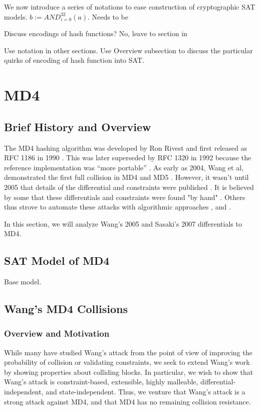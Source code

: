 \documentclass[letterpaper,twocolumn,10pt]{article}
\begin{document}
We now introduce a series of notations to ease construction of cryptographic
SAT models. $b := AND_{i = 0}^{32}(a)$. Needs to be

Discuss encodings of hash functions? No, leave to section in

Use notation in other sections. Use Overview subsection to discuss
the particular quirks of encoding of hash function into SAT.

\section{MD4}
\subsection{Brief History and Overview}

The MD4 hashing algorithm was developed by Ron Rivest and first released as RFC 1186
in 1990 \cite{rfc1186}. This was later superseded by RFC 1320 in 1992 because the
reference implementation was ``more portable'' \cite{rfc1320}. As early as 2004,
Wang et al, demonstrated the first full collision in MD4 and MD5 \cite{cryptoeprint:2004:199}.
However, it wasn't until 2005 that details of the differential and constraints
were published \cite{Wang2005}. It is believed by some that these differentials
and constraints were found "by hand" \cite{cryptoeprint:2007:206}. Others thus
strove to automate these attacks with algorithmic approaches \cite{Schlaffer2006}
\cite{cryptoeprint:2007:206}, and \cite{Sasaki2007}.

In this section, we will analyze Wang's 2005 and Sasaki's 2007 differentials to MD4.

\subsection{SAT Model of MD4}
Base model.

\subsection{Wang's MD4 Collisions}
\subsubsection{Overview and Motivation}
While many have studied Wang's attack from the point of view of improving the
probability of collision or validating constraints, we seek to extend Wang's work
by showing properties about colliding blocks. In particular, we wish to show that
Wang's attack is constraint-based, extensible, highly malleable,
differential-independent, and state-independent. Thus, we venture that Wang's
attack is a strong attack against MD4, and that MD4 has no remaining collision
resistance.
\end{document}

